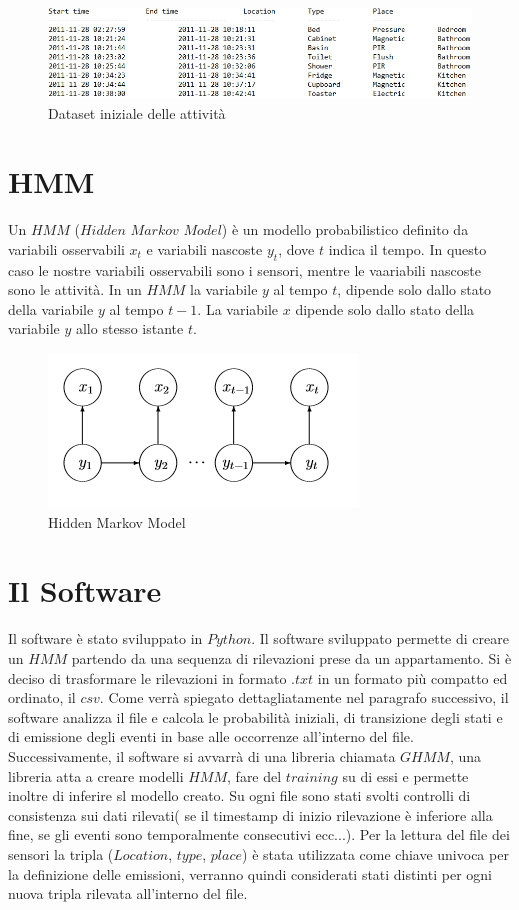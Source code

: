 \documentclass[11pt, a4paper]{scrartcl}
\begin{document}
\begin{figure}[!ht]
\centering
 \includegraphics[scale=0.7]{Sensor.png} 
 \caption{Dataset iniziale delle attività}
\label{fig:magn}
\end{figure}


\section*{HMM}
Un $HMM$ ($Hidden$ $Markov$ $Model$) è un modello probabilistico definito da variabili osservabili $x_t$ e variabili nascoste $y_t$, dove $t$ indica il tempo. In questo caso le nostre variabili osservabili sono i sensori, mentre le vaariabili nascoste sono le attività. In un $HMM$ la variabile $y$ al tempo $t$, dipende solo dallo stato della variabile $y$ al tempo $t-1$. La variabile $x$ dipende solo dallo stato della variabile $y$ allo stesso istante $t$.


\begin{figure}[!ht]
\centering
 \includegraphics[scale=0.7]{HMM.png} 
 \caption{Hidden Markov Model}
\label{fig:magn}
\end{figure}

\section*{Il Software}

Il software è stato sviluppato in $Python$. Il software sviluppato permette di creare un $HMM$ partendo da una sequenza di rilevazioni prese da un appartamento. Si è deciso di trasformare le rilevazioni in formato $.txt$ in un formato più compatto ed ordinato, il $csv$. Come verrà spiegato dettagliatamente nel paragrafo successivo, il software analizza il file e calcola le probabilità iniziali, di transizione degli stati e di emissione degli eventi in base alle occorrenze all'interno del file. Successivamente, il software si avvarrà di una libreria chiamata $GHMM$, una libreria atta a creare modelli $HMM$, fare del $training$ su di essi e permette inoltre di inferire sl modello creato.
Su ogni file sono stati svolti controlli di consistenza sui dati rilevati( se il timestamp di inizio rilevazione è inferiore alla fine, se gli eventi sono temporalmente consecutivi ecc...).
Per la lettura del file dei sensori la tripla ($Location$, $type$, $place$) è stata utilizzata come chiave univoca per la definizione delle emissioni, verranno quindi considerati stati distinti per ogni nuova tripla rilevata all'interno del file.
\end{document}
